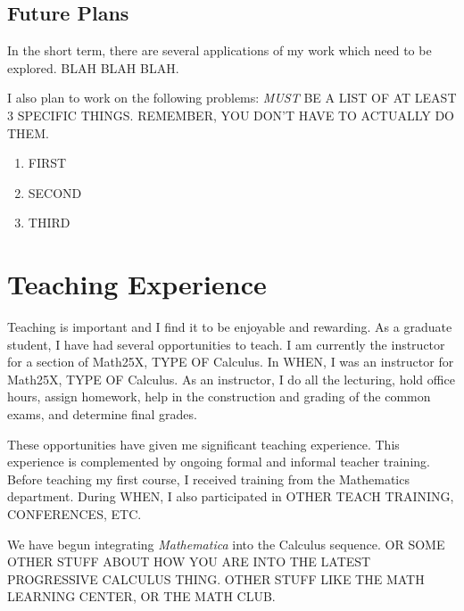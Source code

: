 \documentclass[11pt]{gthesis2}  %
\begin{document}
\subsection*{Future Plans}

In the short term, there are several applications of my work which
need to be explored.  BLAH BLAH BLAH.

I also plan to work on the following problems: {\em MUST} BE A
LIST OF AT LEAST 3 SPECIFIC THINGS. REMEMBER, YOU DON'T HAVE TO
ACTUALLY DO THEM.
%
\begin{enumerate}
    \item  FIRST
    \item  SECOND
    \item  THIRD
\end{enumerate}
%
%
\section*{Teaching Experience}

Teaching is important and I find it to be enjoyable and rewarding.
As a graduate student, I have had several opportunities to teach.
I am currently the instructor for a section of Math25X, TYPE OF
Calculus. In WHEN, I was an instructor for Math25X, TYPE OF
Calculus. As an instructor, I do all the lecturing, hold office
hours, assign homework, help in the construction and grading of
the common exams, and determine final grades.

These opportunities have given me significant teaching experience.
This experience is complemented by ongoing formal and informal
teacher training.  Before teaching my first course, I received
training from the Mathematics department.  During WHEN, I also
participated in OTHER TEACH TRAINING, CONFERENCES, ETC.

We have begun integrating {\em Mathematica} into the Calculus
sequence. OR SOME OTHER STUFF ABOUT HOW YOU ARE INTO THE LATEST
PROGRESSIVE CALCULUS THING. OTHER STUFF LIKE THE MATH LEARNING
CENTER, OR THE MATH CLUB.


%
%
%
\newpage
%
%
%
\printindex
%
%
%
\newpage
%
\thispagestyle{empty}
%
\indent
%
%
%
\end{document}
